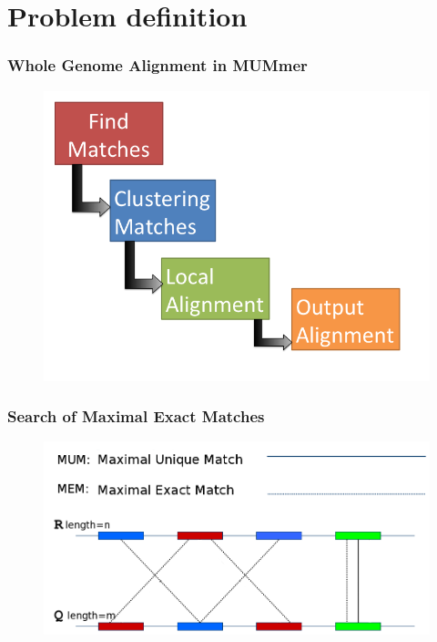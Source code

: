 \documentclass{beamer}
\begin{document}
\section{Problem definition}
\begin{frame}
  \frametitle{Whole Genome Alignment in MUMmer}
  \begin{figure}\includegraphics[scale=0.4]{wga.png}\end{figure}
\end{frame}
\begin{frame}
\frametitle{Search of Maximal Exact Matches}
\begin{figure}\includegraphics[scale=0.4]{mem-mum.png}\end{figure}
\end{frame}
\end{document}
